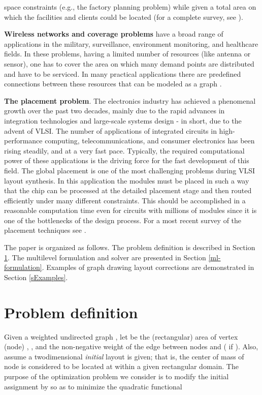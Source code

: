 \documentclass[final]{siamltex}
\begin{document}
space constraints (e.g., the factory planning problem) while given a total area on which the facilities and
clients could be located (for a complete survey, see \cite{dreznerfacility}).
\par {\bf Wireless networks and coverage problems} have a broad range of applications in the military,
surveillance, environment monitoring, and healthcare fields. In
these problems, having a limited number of resources (like antenna
or sensor), one has to cover the area on which many demand points
are distributed and have to be serviced. In many practical
applications there are predefined connections between these
resources that can be modeled as a graph
\cite{meguerdichian01coverage, cardei-energyefficient,
citeulike:717044}.
\par {\bf The placement problem}. The electronics industry has achieved a phenomenal growth over the past
two decades, mainly due to the rapid advances in integration technologies and large-scale systems design - in short,
due to the advent of VLSI. The number of applications of integrated circuits in high-performance computing,
telecommunications, and consumer electronics has been rising steadily, and at a very fast pace. Typically,
the required computational power of these applications is the driving force for the fast development of this field.
The global placement is one of the most challenging problems during VLSI layout synthesis. In this application
the modules must be placed in such a way that the chip can be processed at the detailed placement stage and
then routed efficiently under many different constraints. This should be accomplished in a reasonable computation
time even for circuits with millions of modules since it is one of the bottlenecks of the design process.
For a most recent survey of the placement techniques see \cite{vlsi2007book}.
\par The paper is organized as follows. The problem definition is described in Section \ref{prob-def}.
The multilevel formulation and solver are presented in Section
\ref{ml-formulation}. Examples of graph drawing layout corrections
are demonstrated in Section \ref{sExamples}.

\section{Problem definition}\label{prob-def}
\par Given a weighted undirected graph , let  be the (rectangular)
area of vertex (node) , ,
and  the non-negative weight of the edge  between
nodes  and  ( if ). Also, assume a twodimensional {\it initial} layout is given; that is, the center of
mass of node  is considered to be located at  within a given rectangular domain. The purpose of
the optimization problem we consider is to modify the initial
assignment  by 
so as to minimize the quadratic functional
\end{document}
